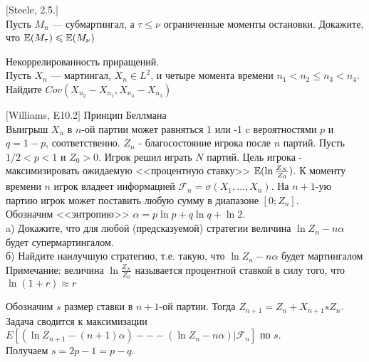 \begin{problem}
$[$Steele, 2.5.$]$ \\
Пусть $M_{n}$ --- субмартингал, а $\tau\le\nu$ ограниченные моменты
остановки. Докажите, что $\mathbb{E}(M_{\tau})\leqslant \mathbb{E}(M_{\nu})$ 
\end{problem} 
\begin{solution} 

\end{solution}

\begin{problem}
Некоррелированность приращений. \\
Пусть $X_{n}$ --- мартингал, $X_{n}\in L^{2}$, и четыре момента
времени $n_{1}<n_{2}\le n_{3}<n_{4}$. \\
Найдите $Cov(X_{n_{2}}-X_{n_{1}},X_{n_{4}}-X_{n_{3}})$ 
\end{problem} 
\begin{solution} 

\end{solution}

\begin{problem}
$[$Williams, E10.2$]$ Принцип Беллмана \\
Выигрыш $X_{n}$ в $n$-ой партии может равняться 1 или -1 c
вероятностями $p$ и $q=1-p$, соответственно. $Z_{n}$ -
благосостояние игрока после $n$ партий. Пусть $1/2<p<1$ и
$Z_{0}>0$. Игрок решил играть $N$ партий. Цель игрока -
максимизировать ожидаемую <<процентную ставку>>
$\mathbb{E}(\ln\frac{Z_{N}}{Z_{0}})$. К моменту времени $n$ игрок владеет
информацией $\mathcal{F}_{n}=\sigma(X_{1},\ldots,X_{n})$. На $n+1$-ую
партию игрок может поставить любую сумму в диапазоне $[0;Z_{n}]$.
\\
Обозначим <<энтропию>> $\alpha=p\ln p+q\ln q+\ln 2$. \\
a) Докажите, что для любой (предсказуемой) стратегии величина $\ln
Z_{n}-n\alpha$ будет супермартингалом. \\
б) Найдите наилучшую стратегию, т.е. такую, что $\ln
Z_{n}-n\alpha$ будет мартингалом \\
Примечание: величина $\ln\frac{Z_{N}}{Z_{0}}$ называется
процентной ставкой в силу того, что $\ln(1+r)\approx r$ 
\end{problem} 
\begin{solution} 

Обозначим $s$ размер ставки в $n+1$-ой партии. Тогда
$Z_{n+1}=Z_{n}+X_{n+1}sZ_{n}$. \\
Задача сводится к максимизации $E[(\ln Z_{n+1}-(n+1)\alpha) --- (\ln
Z_{n}-n\alpha)|\mathcal{F}_{n}]$ по $s$. \\
Получаем $s=2p-1=p-q$. 
\end{solution}

